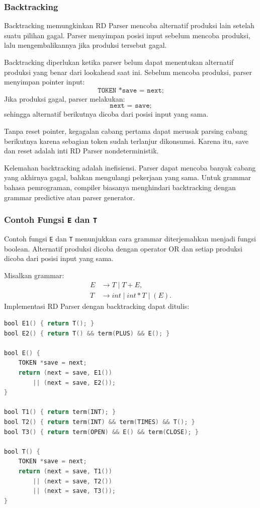 \subsubsection{Backtracking}

\begin{jawab}
Backtracking memungkinkan RD Parser mencoba alternatif produksi lain setelah suatu pilihan gagal. Parser menyimpan posisi input sebelum mencoba produksi, lalu mengembalikannya jika produksi tersebut gagal.
\end{jawab}

Backtracking diperlukan ketika parser belum dapat menentukan alternatif produksi yang benar dari lookahead saat ini. Sebelum mencoba produksi, parser menyimpan pointer input:
\[
    \texttt{TOKEN *save = next;}
\]
Jika produksi gagal, parser melakukan:
\[
    \texttt{next = save;}
\]
sehingga alternatif berikutnya dicoba dari posisi input yang sama.

Tanpa reset pointer, kegagalan cabang pertama dapat merusak parsing cabang berikutnya karena sebagian token sudah terlanjur dikonsumsi. Karena itu, save dan reset adalah inti RD Parser nondeterministik.

Kelemahan backtracking adalah inefisiensi. Parser dapat mencoba banyak cabang yang akhirnya gagal, bahkan mengulangi pekerjaan yang sama. Untuk grammar bahasa pemrograman, compiler biasanya menghindari backtracking dengan grammar predictive atau parser generator.

\subsubsection{Contoh Fungsi \texttt{E} dan \texttt{T}}

\begin{jawab}
Contoh fungsi \texttt{E} dan \texttt{T} menunjukkan cara grammar diterjemahkan menjadi fungsi boolean. Alternatif produksi dicoba dengan operator OR dan setiap produksi dicoba dari posisi input yang sama.
\end{jawab}

Misalkan grammar:
\[
\begin{aligned}
E &\rightarrow T \mid T + E,\\
T &\rightarrow int \mid int * T \mid (E).
\end{aligned}
\]
Implementasi RD Parser dengan backtracking dapat ditulis:

\begin{lstlisting}[language=C, caption={Recursive descent parser dengan backtracking}, label={lst:rd-parser-et}]
bool E1() { return T(); }
bool E2() { return T() && term(PLUS) && E(); }

bool E() {
    TOKEN *save = next;
    return (next = save, E1())
        || (next = save, E2());
}

bool T1() { return term(INT); }
bool T2() { return term(INT) && term(TIMES) && T(); }
bool T3() { return term(OPEN) && E() && term(CLOSE); }

bool T() {
    TOKEN *save = next;
    return (next = save, T1())
        || (next = save, T2())
        || (next = save, T3());
}
\end{lstlisting}

